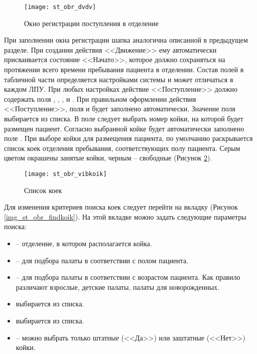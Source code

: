\begin{figure}[ht]\centering
   \texttt{[image: st\_obr\_dvdv]}
   \caption{Окно регистрации поступления в отделение}
   \label{img_st_obr_dvdv}
 \end{figure}
 
При заполнении окна регистрации шапка аналогична описанной в предыдущем разделе. При создании действия <<Движение>> ему автоматически присваивается состояние <<Начато>>, которое должно сохраняться на протяжении всего времени пребывания пациента в отделении. Состав полей в табличной части определяется настройками системы и может отличаться в каждом ЛПУ. При любых настройках действие <<Поступление>> должно содержать поля , , ,  и . При правильном оформлении действия <<Поступление>>, поля  и  будет заполнено автоматически. Значение поля  выбирается из списка. В поле  следует выбрать номер койки, на которой будет размещен пациент. Согласно выбранной койке будет автоматически заполнено поле . При выборе койки для размещения пациента, по умолчанию раскрывается список коек отделения пребывания, соответствующих полу пациента. Серым цветом окрашены занятые койки, черным – свободные (Рисунок \ref{img_st_obr_vibkoik}).

\begin{figure}[ht]\centering
   \texttt{[image: st\_obr\_vibkoik]}
   \caption{Список коек}
   \label{img_st_obr_vibkoik}
\end{figure}

Для изменения критериев поиска коек следует перейти на вкладку  (Рисунок \ref{img_st_obr_findkoik}). На этой вкладке можно задать следующие параметры поиска:
\begin{itemize}
 \item {} – отделение, в котором располагается койка.
 \item {} – для подбора палаты в соответствии с полом пациента.
 \item {} – для подбора палаты в соответствии с возрастом пациента. Как правило различают взрослые, детские палаты, палаты для новорожденных.
 \item {} выбирается из списка.
 \item {} выбирается из списка.
 \item {} – можно выбрать только штатные (<<Да>>) или заштатные (<<Нет>>) койки.
\end{itemize}
 
